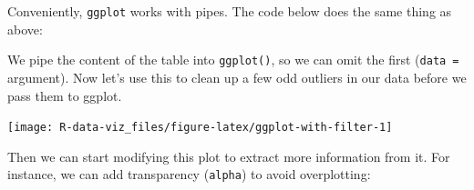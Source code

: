 \documentclass[]{book}
\newenvironment{Shaded}{\begin{snugshade}}{\end{snugshade}}
\newcommand{\KeywordTok}[1]{\textcolor[rgb]{0.13,0.29,0.53}{\textbf{#1}}}
\newcommand{\DataTypeTok}[1]{\textcolor[rgb]{0.13,0.29,0.53}{#1}}
\newcommand{\FloatTok}[1]{\textcolor[rgb]{0.00,0.00,0.81}{#1}}
\newcommand{\StringTok}[1]{\textcolor[rgb]{0.31,0.60,0.02}{#1}}
\newcommand{\OperatorTok}[1]{\textcolor[rgb]{0.81,0.36,0.00}{\textbf{#1}}}
\newcommand{\NormalTok}[1]{#1}
\theoremstyle{definition}
\theoremstyle{definition}
\theoremstyle{definition}
\theoremstyle{remark}
\begin{document}
Conveniently, \texttt{ggplot} works with pipes. The code below does the
same thing as above:

\begin{Shaded}
\end{Shaded}

We pipe the content of the table into \texttt{ggplot()}, so we can omit
the first (\texttt{data\ =} argument). Now let's use this to clean up a
few odd outliers in our data before we pass them to ggplot.

\begin{Shaded}
\end{Shaded}

\texttt{[image: R-data-viz\_files/figure-latex/ggplot-with-filter-1]}

Then we can start modifying this plot to extract more information from
it. For instance, we can add transparency (\texttt{alpha}) to avoid
overplotting:

\begin{Shaded}
\end{Shaded}
\end{document}
